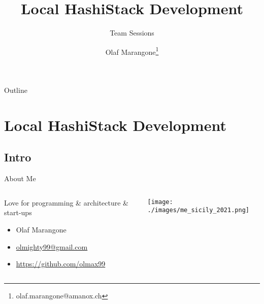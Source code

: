 \documentclass[presentation]{beamer}
\author{Olaf Marangone\thanks{olaf.marangone@amanox.ch}}
\date{}
\title{Local HashiStack Development}
\subtitle{Team Sessions}
\begin{document}
\maketitle
\begin{frame}{Outline}
\tableofcontents
\end{frame}


\section{Local HashiStack Development}
\label{sec:org063893e}
\subsection{Intro}
\label{sec:orgc314757}
\begin{frame}[label={sec:org4dd0353}]{About Me}
\begin{columns}
\begin{column}{0.65\columnwidth}
\begin{block}{Love for programming \& architecture \& start-ups}
\begin{itemize}
\item Olaf Marangone
\item \href{mailto:olmighty99@gmail.com}{olmighty99@gmail.com}
\item \href{https://github.com/olmax99}{https://github.com/olmax99}
\end{itemize}
\end{block}
\end{column}

\begin{column}{0.35\columnwidth}
\begin{example}[Sicily 2021]
\begin{center}
\texttt{[image: ./images/me\_sicily\_2021.png]}
\end{center}
\end{example}
\end{column}
\end{columns}
\end{frame}
\end{document}
